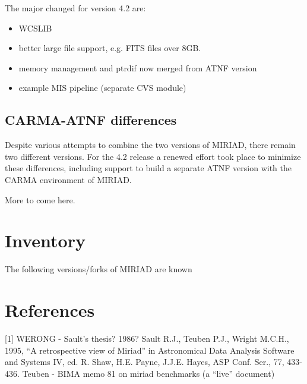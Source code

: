 The major changed for version 4.2 are:

\begin{itemize}
\item
WCSLIB
\item
better large file support, e.g. FITS files over 8GB.
\item
memory management and ptrdif now merged from ATNF version
\item
example MIS pipeline (separate CVS module)

\end{itemize}

\subsection{CARMA-ATNF differences}

Despite various attempts to combine the two versions of MIRIAD, there 
remain two different versions. For the 4.2 release a renewed effort
took place to minimize these differences, including support to build
a separate ATNF version with the CARMA environment of MIRIAD.

More to come here.
\section{Inventory}

The following versions/forks of MIRIAD are known
\section*{References}

[1] WERONG - Sault's thesis? 1986?
\newline
[2] Sault R.J., Teuben P.J., Wright M.C.H., 1995,
 ``A retrospective view of Miriad'' in 
Astronomical Data Analysis Software and Systems IV, 
ed. R. Shaw, H.E. Payne, J.J.E. Hayes, ASP Conf. Ser., 77, 433-436.
\newline
[3] Teuben - BIMA memo 81 on miriad benchmarks (a ``live'' document)
\newline


